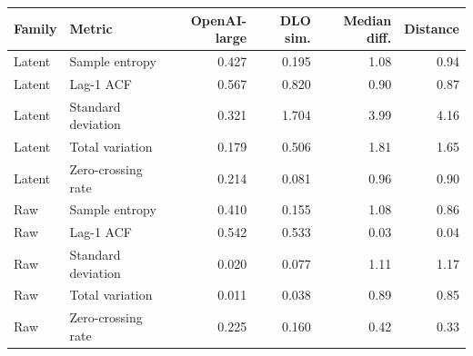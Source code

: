 \begin{tabular}{llrrrr}
\toprule
Family & Metric & OpenAI-large & DLO sim. & Median diff. & Distance \\
\midrule
Latent & Sample entropy & 0.427 & 0.195 & 1.08 & 0.94 \\
Latent & Lag-1 ACF & 0.567 & 0.820 & 0.90 & 0.87 \\
Latent & Standard deviation & 0.321 & 1.704 & 3.99 & 4.16 \\
Latent & Total variation & 0.179 & 0.506 & 1.81 & 1.65 \\
Latent & Zero-crossing rate & 0.214 & 0.081 & 0.96 & 0.90 \\
Raw & Sample entropy & 0.410 & 0.155 & 1.08 & 0.86 \\
Raw & Lag-1 ACF & 0.542 & 0.533 & 0.03 & 0.04 \\
Raw & Standard deviation & 0.020 & 0.077 & 1.11 & 1.17 \\
Raw & Total variation & 0.011 & 0.038 & 0.89 & 0.85 \\
Raw & Zero-crossing rate & 0.225 & 0.160 & 0.42 & 0.33 \\
\bottomrule
\end{tabular}
